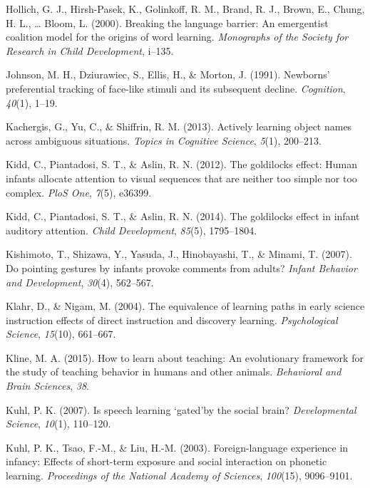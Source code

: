 \documentclass[english,man]{apa6}
\theoremstyle{definition}
\theoremstyle{definition}
\theoremstyle{definition}
\theoremstyle{remark}
\begin{document}
\hypertarget{ref-hollich2000breaking}{}
Hollich, G. J., Hirsh-Pasek, K., Golinkoff, R. M., Brand, R. J., Brown,
E., Chung, H. L., \ldots{} Bloom, L. (2000). Breaking the language
barrier: An emergentist coalition model for the origins of word
learning. \emph{Monographs of the Society for Research in Child
Development}, i--135.

\hypertarget{ref-johnson1991newborns}{}
Johnson, M. H., Dziurawiec, S., Ellis, H., \& Morton, J. (1991).
Newborns' preferential tracking of face-like stimuli and its subsequent
decline. \emph{Cognition}, \emph{40}(1), 1--19.

\hypertarget{ref-kachergis2013actively}{}
Kachergis, G., Yu, C., \& Shiffrin, R. M. (2013). Actively learning
object names across ambiguous situations. \emph{Topics in Cognitive
Science}, \emph{5}(1), 200--213.

\hypertarget{ref-kidd2012goldilocks}{}
Kidd, C., Piantadosi, S. T., \& Aslin, R. N. (2012). The goldilocks
effect: Human infants allocate attention to visual sequences that are
neither too simple nor too complex. \emph{PloS One}, \emph{7}(5),
e36399.

\hypertarget{ref-kidd2014goldilocks}{}
Kidd, C., Piantadosi, S. T., \& Aslin, R. N. (2014). The goldilocks
effect in infant auditory attention. \emph{Child Development},
\emph{85}(5), 1795--1804.

\hypertarget{ref-kishimoto2007pointing}{}
Kishimoto, T., Shizawa, Y., Yasuda, J., Hinobayashi, T., \& Minami, T.
(2007). Do pointing gestures by infants provoke comments from adults?
\emph{Infant Behavior and Development}, \emph{30}(4), 562--567.

\hypertarget{ref-klahr2004equivalence}{}
Klahr, D., \& Nigam, M. (2004). The equivalence of learning paths in
early science instruction effects of direct instruction and discovery
learning. \emph{Psychological Science}, \emph{15}(10), 661--667.

\hypertarget{ref-kline2015learn}{}
Kline, M. A. (2015). How to learn about teaching: An evolutionary
framework for the study of teaching behavior in humans and other
animals. \emph{Behavioral and Brain Sciences}, \emph{38}.

\hypertarget{ref-kuhl2007speech}{}
Kuhl, P. K. (2007). Is speech learning `gated'by the social brain?
\emph{Developmental Science}, \emph{10}(1), 110--120.

\hypertarget{ref-kuhl2003foreign}{}
Kuhl, P. K., Tsao, F.-M., \& Liu, H.-M. (2003). Foreign-language
experience in infancy: Effects of short-term exposure and social
interaction on phonetic learning. \emph{Proceedings of the National
Academy of Sciences}, \emph{100}(15), 9096--9101.
\end{document}
